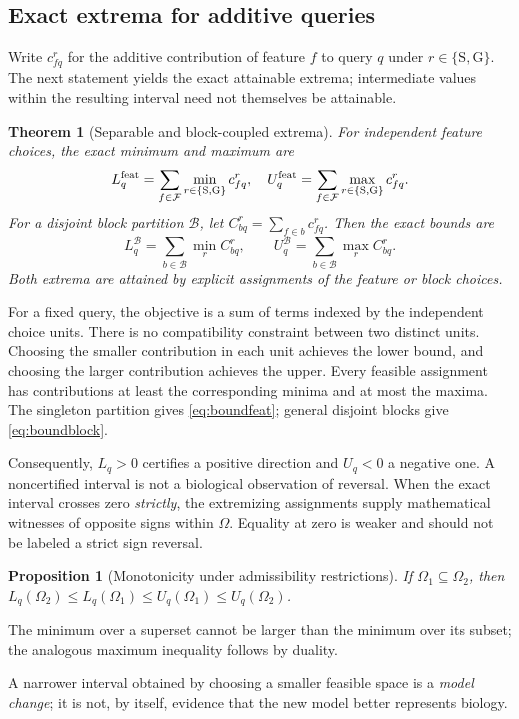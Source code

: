 \documentclass[conference]{IEEEtran}
\newtheorem{theorem}{Theorem}
\newtheorem{proposition}{Proposition}
\newcommand{\OO}{\mathcal{\Omega}}
\newcommand{\F}{\mathcal{F}}
\newcommand{\B}{\mathcal{B}}
\newcommand{\Sref}{\mathrm{S}}
\newcommand{\Gref}{\mathrm{G}}
\begin{document}
\subsection{Exact extrema for additive queries}
Write $c_{fq}^{r}$ for the additive contribution of feature $f$ to query $q$ under $r\in\{\Sref,\Gref\}$. The next statement yields the exact attainable extrema; intermediate values within the resulting interval need not themselves be attainable.

\begin{theorem}[Separable and block-coupled extrema]
For independent feature choices, the exact minimum and maximum are
\begin{equation}
 L_q^{\rm feat}=\sum_{f\in\F}\min_{r\in\{\Sref,\Gref\}}c_{fq}^{r},\quad
 U_q^{\rm feat}=\sum_{f\in\F}\max_{r\in\{\Sref,\Gref\}}c_{fq}^{r}.
\label{eq:boundfeat}
\end{equation}
For a disjoint block partition $\B$, let $C_{bq}^{r}=\sum_{f\in b}c_{fq}^{r}$. Then the exact bounds are
\begin{equation}
 L_q^{\B}=\sum_{b\in\B}\min_r C_{bq}^{r},\qquad
 U_q^{\B}=\sum_{b\in\B}\max_r C_{bq}^{r}.
\label{eq:boundblock}
\end{equation}
Both extrema are attained by explicit assignments of the feature or block choices.
\end{theorem}
\begin{IEEEproof}
For a fixed query, the objective is a sum of terms indexed by the independent choice units. There is no compatibility constraint between two distinct units. Choosing the smaller contribution in each unit achieves the lower bound, and choosing the larger contribution achieves the upper. Every feasible assignment has contributions at least the corresponding minima and at most the maxima. The singleton partition gives \eqref{eq:boundfeat}; general disjoint blocks give \eqref{eq:boundblock}.
\end{IEEEproof}

Consequently, $L_q>0$ certifies a positive direction and $U_q<0$ a negative one. A noncertified interval is not a biological observation of reversal. When the exact interval crosses zero \emph{strictly}, the extremizing assignments supply mathematical witnesses of opposite signs within $\OO$. Equality at zero is weaker and should not be labeled a strict sign reversal.

\begin{proposition}[Monotonicity under admissibility restrictions]
If $\OO_1\subseteq\OO_2$, then
$L_q(\OO_2)\le L_q(\OO_1)\le U_q(\OO_1)\le U_q(\OO_2)$.
\end{proposition}
\begin{IEEEproof}
The minimum over a superset cannot be larger than the minimum over its subset; the analogous maximum inequality follows by duality.
\end{IEEEproof}
A narrower interval obtained by choosing a smaller feasible space is a \emph{model change}; it is not, by itself, evidence that the new model better represents biology.
\end{document}
